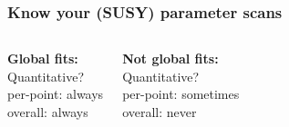 \documentclass[xcolor=dvipsnames]{beamer}
\begin{document}
\begin{frame}
\frametitle{Know your (SUSY) parameter scans}

\begin{columns}[c]
\textbf{Global fits:}\\
\footnotesize\vspace{2mm}
Quantitative?\\
\hspace{2mm}per-point: always\\
\hspace{2mm}overall: always\vspace{15mm}

\textbf{Not global fits:}\\
\footnotesize\vspace{2mm}
Quantitative?\\
\hspace{2mm}per-point: sometimes\\
\hspace{2mm}overall: never\vspace{5mm}



\end{columns}
\end{frame}
\end{document}
